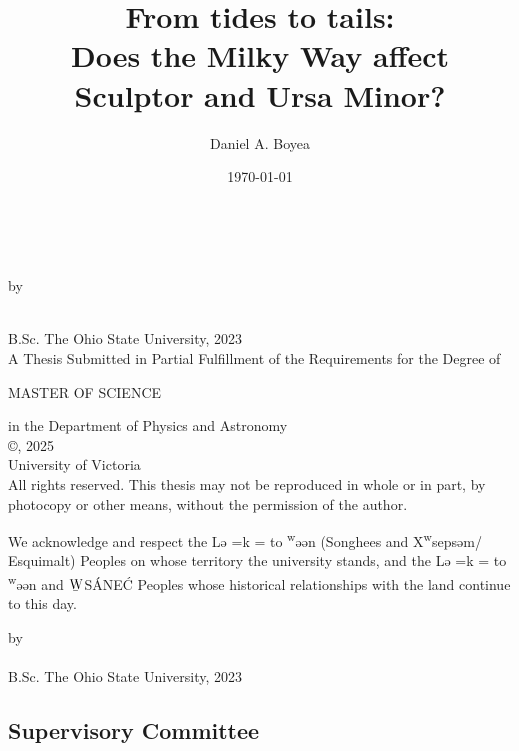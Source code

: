 \documentclass[12pt,oneside,letterpaper]{report}
\title{From tides to tails: \\
    Does the Milky Way affect Sculptor and Ursa Minor?
}
\author{Daniel A. Boyea}
\date{\today}
\newcommand{\schwa}{ə}
\newcommand{\Lekwnen}{L\schwa{}\overcomma{k}\textsuperscript{w}\schwa{}\ng{}\schwa{}n}
\newcommand{\skipline}{\vspace{\baselineskip}}
\def\overcomma#1{%
  \setbox0=\hbox{#1}%
  \dimen0=\wd0       %
  \vbox{%
    \hbox to \dimen0{\hfil,\hfil}%
    \nointerlineskip            %
    \box0                       %
  }%
}
\begin{document}


\makeatletter
\begin{titlepage}
   \begin{center}
       \textbf{\large \@title}\\
        \skipline

        by\\
        \skipline

       \@author\\
       B.Sc. The Ohio State University, 2023\\
       \vspace*{3\baselineskip}
    A Thesis Submitted in Partial Fulfillment of the Requirements for the Degree of\\
    \skipline

    MASTER OF SCIENCE \\
    \skipline

    in the Department of Physics and Astronomy\\
       \vfill
       {\small
       ©\@author, 2025\\
       University of Victoria\\
   }
   \skipline
       {\small
       All rights reserved. This thesis may not be reproduced in whole or in part,
   by photocopy or other means, without the permission of the author.} \\
\skipline
   \end{center}
We acknowledge and respect the \Lekwnen{} (Songhees and X\textsuperscript{w}seps\schwa{}m/
Esquimalt) Peoples on whose territory the university stands, and the
\Lekwnen{} and ${\underaccent{\bar}{\rm W}}$S\'ANE\'C Peoples whose historical relationships with the
land continue to this day. 
\end{titlepage}

\addtocounter{page}{1}


\begin{centering}
\textbf{\@title}
\skipline
by\\
\skipline
\@author\\
B.Sc. The Ohio State University, 2023\\
\vspace*{3\baselineskip}
\end{centering}

\subsection*{Supervisory Committee}
\end{document}
